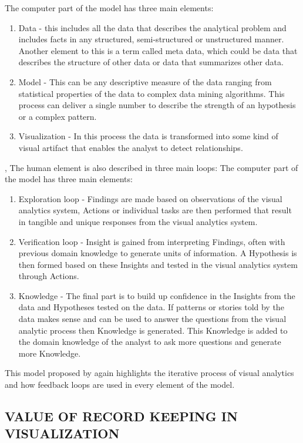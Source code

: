 The computer part of the model has three main elements:
\begin{enumerate}
	\item Data - this includes all the data that describes the analytical problem and includes facts in any structured, semi-structured or unstructured manner. Another element to this is a term called meta data, which could be data that describes the structure of other data or data that summarizes other data.
	\item Model - This can be any descriptive measure of the data ranging from statistical properties of the data to complex data mining algorithms. This process can deliver a single number to describe the strength of an hypothesis or a complex pattern.
	\item Visualization - In this process the data is transformed into some kind of visual artifact that enables the analyst to detect relationships.
\end{enumerate}, 
The human element is also described in three main loops:
The computer part of the model has three main elements:
\begin{enumerate}
	\item Exploration loop - Findings are made based on observations of the visual analytics system, Actions or individual tasks are then performed that result in tangible  and unique responses from the visual analytics system. 
	\item Verification loop - Insight is gained from interpreting Findings, often with previous domain knowledge to generate units of information. A Hypothesis is then formed based on these Insights and tested in the visual analytics system through Actions.
	\item Knowledge - The final part is to build up confidence in the Insights from the data and Hypotheses tested on the data. If  patterns or stories told by the data makes sense and can be used to answer the questions from the visual analytic process then Knowledge is generated. This Knowledge is added to the domain knowledge of the analyst to ask more questions and generate more Knowledge.
\end{enumerate}
This model proposed by \cite{sacha2014knowledge} again highlights the iterative process of visual analytics and how feedback loops are used in every element of the model.


\subsection{VALUE OF RECORD KEEPING IN VISUALIZATION}

